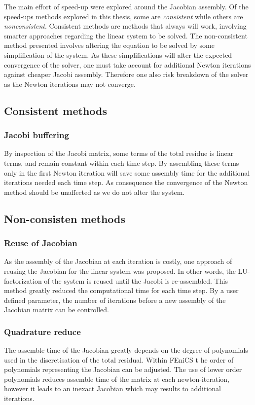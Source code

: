 The main effort of speed-up were explored around the Jacobian assembly.
Of the speed-ups methods explored in this thesis, some are \textit{consistent} while others are \textit{nonconsistent}. Consistent methods are methods that always will work, involving smarter approaches regarding the linear system to be solved. The non-consistent method presented involves altering the equation to be solved by some simplification of the system. As these simplifications will alter the expected convergence of the solver, one must take account for additional Newton iterations against cheaper Jacobi assembly. Therefore one also risk breakdown of the solver as the Newton iterations may not converge.   


\subsection{Consistent methods}
\subsubsection{Jacobi buffering}
By inspection of the Jacobi matrix, some terms of the total residue is linear terms, and remain constant within each time step. By assembling these terms only in the first Newton iteration will save some assembly time for the additional iterations needed each time step. As consequence the convergence of the Newton method should be unaffected as we do not alter the system.  

\subsection{Non-consisten methods}    
\subsubsection{Reuse of Jacobian}
As the assembly of the Jacobian at each iteration is costly, one approach of reusing the Jacobian for the linear system was proposed. In other words, the LU-factorization of the system is reused until the Jacobi is re-assembled. This method greatly reduced the computational time for each time step. By a user defined parameter, the number of iterations before a new assembly of the Jacobian matrix can be controlled. 

\subsubsection{Quadrature reduce}
The assemble time of the Jacobian greatly depends on the degree of polynomials used in the discretisation of the total residual. Within FEniCS t he order of polynomials representing the Jacobian can be adjusted. The use of lower order polynomials reduces assemble time of the matrix at each newton-iteration, however it leads to an inexact Jacobian which may results to additional iterations. 


